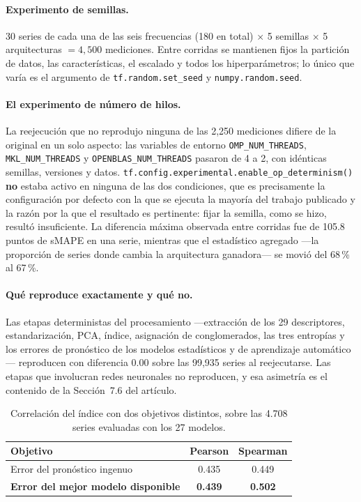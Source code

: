 \paragraph{Experimento de semillas.} 30 series de cada una de las seis frecuencias
(180 en total) $\times$ 5 semillas $\times$ 5 arquitecturas $=4{,}500$ mediciones. Entre
corridas se mantienen fijos la partición de datos, las características, el escalado y
todos los hiperparámetros; lo único que varía es el argumento de
\texttt{tf.random.set\_seed} y \texttt{numpy.random.seed}.

\paragraph{El experimento de número de hilos.} La reejecución que no reprodujo ninguna
de las 2{,}250 mediciones difiere de la original en un solo aspecto: las variables de
entorno \texttt{OMP\_NUM\_THREADS}, \texttt{MKL\_NUM\_THREADS} y
\texttt{OPENBLAS\_NUM\_THREADS} pasaron de 4 a 2, con idénticas semillas, versiones y
datos. \texttt{tf.config.experimental.enable\_op\_determinism()} \textbf{no} estaba
activo en ninguna de las dos condiciones, que es precisamente la configuración por
defecto con la que se ejecuta la mayoría del trabajo publicado y la razón por la que el
resultado es pertinente: fijar la semilla, como se hizo, resultó insuficiente. La
diferencia máxima observada entre corridas fue de 105.8 puntos de sMAPE en una serie,
mientras que el estadístico agregado ---la proporción de series donde cambia la
arquitectura ganadora--- se movió del 68\,\% al 67\,\%.

\paragraph{Qué reproduce exactamente y qué no.} Las etapas deterministas del
procesamiento ---extracción de los 29 descriptores, estandarización, PCA, índice,
asignación de conglomerados, las tres entropías y los errores de pronóstico de los
modelos estadísticos y de aprendizaje automático--- reproducen con diferencia $0.00$
sobre las 99{,}935 series al reejecutarse. Las etapas que involucran redes neuronales no
reproducen, y esa asimetría es el contenido de la Sección~7.6 del artículo.

\begin{table}[htbp]
\centering
\caption{Correlación del índice con dos objetivos distintos, sobre las 4.708 series
evaluadas con los 27 modelos.}
\label{tab:oraculo}
\begin{tabular}{lcc}
\toprule
\textbf{Objetivo} & \textbf{Pearson} & \textbf{Spearman} \\
\midrule
Error del pronóstico ingenuo        & 0.435 & 0.449 \\
\textbf{Error del mejor modelo disponible} & \textbf{0.439} & \textbf{0.502} \\
\bottomrule
\end{tabular}
\end{table}

